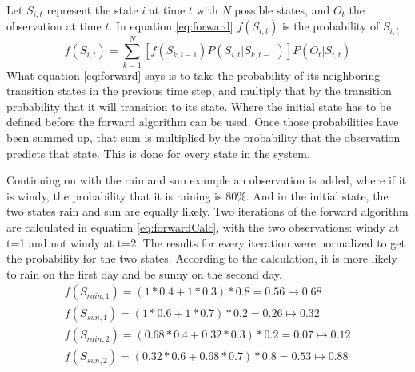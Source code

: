 \documentclass[12pt, a4paper]{article}
\begin{document}
Let $S_{i,t}$ represent the state $i$ at time $t$ with $N$ possible states, and $O_t$ the observation at time $t$. In equation \ref{eq:forward} $f(S_{i,t})$ is the probability of $S_{i,t}$\cite{MA-forw}.
\begin{equation}\label{eq:forward}
f(S_{i,t}) = \sum_{k=1}^{N} [f(S_{k,t-1})P(S_{i,t}|S_{k,t-1})]P(O_t|S_{i,t})
\end{equation}
What equation \ref{eq:forward} says is to take the probability of its neighboring transition states in the previous time step, and multiply that by the transition probability that it will transition to its state. Where the initial state has to be defined before the forward algorithm can be used. Once those probabilities have been summed up, that sum is multiplied by the probability that the observation predicts that state. This is done for every state in the system.

Continuing on with the rain and sun example an observation is added, where if it is windy, the probability that it is raining is 80\%. And in the initial state, the two states rain and sun are equally likely. Two iterations of the forward algorithm are calculated in equation \ref{eq:forwardCalc}, with the two observations: windy at t=1 and not windy at t=2. The results for every iteration were normalized to get the probability for the two states. According to the calculation, it is more likely to rain on the first day and be sunny on the second day.
\begin{equation}\label{eq:forwardCalc}
\begin{split}
f(S_{rain,1}) = (1*0.4+1*0.3)*0.8 = 0.56 \mapsto 0.68\hspace{29pt}
\\
f(S_{sun,1}) = (1*0.6+1*0.7)*0.2 = 0.26 \mapsto 0.32\hspace{32pt}
\\
f(S_{rain,2}) = (0.68*0.4+0.32*0.3)*0.2 = 0.07 \mapsto 0.12
\\
f(S_{sun,2}) = (0.32*0.6+0.68*0.7)*0.8 = 0.53 \mapsto 0.88\hspace{3pt}
\end{split}
\end{equation}

\end{document}
